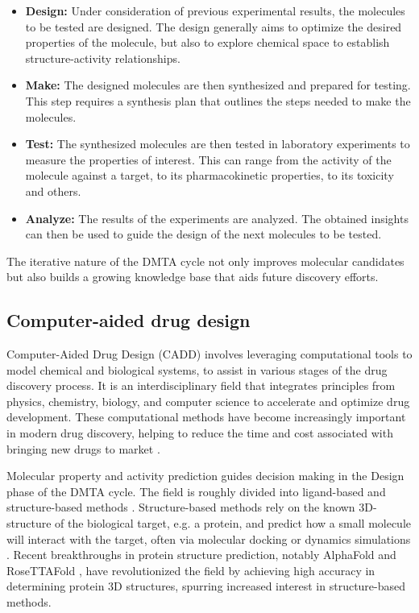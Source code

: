 \begin{itemize}
	\item \textbf{Design:} Under consideration of previous experimental results, the molecules to
	      be tested are designed. The design generally aims to optimize the desired properties of
	      the molecule, but also to explore chemical space to establish structure-activity relationships.
	\item \textbf{Make:} The designed molecules are then synthesized and prepared for testing. This
	      step requires a synthesis plan that outlines the steps needed to make the molecules.
	\item \textbf{Test:} The synthesized molecules are then tested in laboratory experiments to
	      measure the properties of interest. This can range from the activity of the molecule
	      against a target, to its pharmacokinetic properties, to its toxicity and others.
	\item \textbf{Analyze:} The results of the experiments are analyzed. The obtained insights
	      can then be used to guide the design of the next molecules to be tested.
\end{itemize}

The iterative nature of the \ac{DMTA} cycle not only improves molecular candidates but also builds a growing knowledge
base that aids future discovery efforts.

\subsection{Computer-aided drug design}
Computer-Aided Drug Design (\ac{CADD}) involves leveraging computational tools to model chemical and biological systems,
to assist in various stages of the drug discovery process. It is an interdisciplinary field that integrates
principles from physics, chemistry, biology, and computer science to accelerate and optimize drug development.
These computational methods have become increasingly important in modern drug discovery, helping to reduce the time and cost
associated with bringing new drugs to market
\citep{brownArtificialIntelligenceChemistry2020,niaziComputerAidedDrugDesign2023,sliwoskiComputationalMethodsDrug2014}.

Molecular property and activity prediction guides decision making in the Design phase of the \ac{DMTA} cycle. The
field is roughly divided into ligand-based and structure-based methods \citep{yuComputerAidedDrugDesign2017}.
Structure-based methods rely on the known 3D-structure of the biological target, e.g. a protein, and predict how a small
molecule will interact with the target, often via molecular docking \citep{morrisMolecularDocking2008} or dynamics
simulations \citep{weiStructureDynamicsDrug2024,hospitalMolecularDynamicsSimulations2015}. Recent breakthroughs in
protein structure prediction, notably AlphaFold \citep{jumperHighlyAccurateProtein2021} and RoseTTAFold
\citep{baekAccuratePredictionProtein2021}, have revolutionized the field by achieving high accuracy in
determining protein 3D structures, spurring increased interest in structure-based methods.

